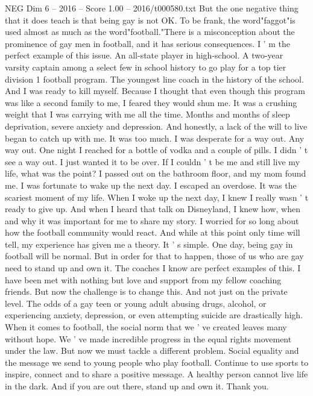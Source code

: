 \begin{textsample}{NEG Dim 6 – 2016 – Score 1.00 – 2016/t000580.txt}
But the one negative thing that it does teach is that being gay is not OK.
To be frank, the word"faggot"is used almost as much as the word"football."There is a misconception about the prominence of gay men in football, and it has serious consequences.
I ' m the perfect example of this issue.
An all-state player in high-school.
A two-year varsity captain among a select few in school history to go play for a top tier division 1 football program.
The youngest line coach in the history of the school.
And I was ready to kill myself.
Because I thought that even though this program was like a second family to me, I feared they would shun me.
It was a crushing weight that I was carrying with me all the time.
Months and months of sleep deprivation, severe anxiety and depression.
And honestly, a lack of the will to live began to catch up with me.
It was too much.
I was desperate for a way out.
Any way out.
One night I reached for a bottle of vodka and a couple of pills.
I didn ' t see a way out.
I just wanted it to be over.
If I couldn ' t be me and still live my life, what was the point?
I passed out on the bathroom floor, and my mom found me.
I was fortunate to wake up the next day.
I escaped an overdose.
It was the scariest moment of my life.
When I woke up the next day, I knew I really wasn ' t ready to give up.
And when I heard that talk on Disneyland, I knew how, when and why it was important for me to share my story.
I worried for so long about how the football community would react.
And while at this point only time will tell, my experience has given me a theory.
It ' s simple.
One day, being gay in football will be normal.
But in order for that to happen, those of us who are gay need to stand up and own it.
The coaches I know are perfect examples of this.
I have been met with nothing but love and support from my fellow coaching friends.
But now the challenge is to change this.
And not just on the private level.
The odds of a gay teen or young adult abusing drugs, alcohol, or experiencing anxiety, depression, or even attempting suicide are drastically high.
When it comes to football, the social norm that we ' ve created leaves many without hope.
We ' ve made incredible progress in the equal rights movement under the law.
But now we must tackle a different problem.
Social equality and the message we send to young people who play football.
Continue to use sports to inspire, connect and to share a positive message.
A healthy person cannot live life in the dark.
And if you are out there, stand up and own it.
Thank you.

\end{textsample}
